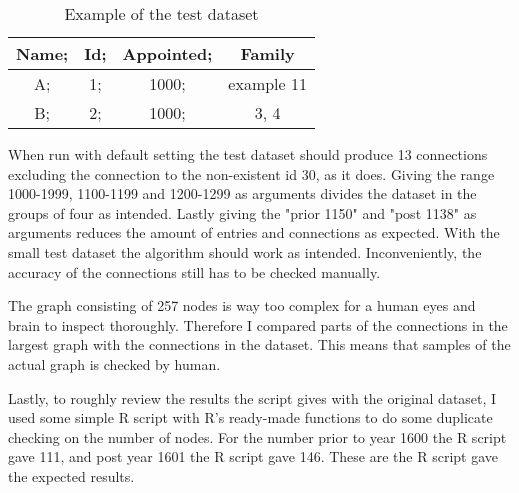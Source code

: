 \begin{table}
	\caption{Example of the test dataset}
	\centering
	\begin{tabular}{cccc}	
		\hline
		Name; &Id; &Appointed; &Family\\
		\hline
		A; &1; &1000; &example 11\\
		\hline
		B; &2; &1000; &3, 4\\
		\hline
	\end{tabular}
\end{table}

When run with default setting the test dataset should produce 13 connections excluding the connection to the non-existent id 30, as it does. Giving the range 1000-1999, 1100-1199 and 1200-1299 as arguments divides the dataset in the groups of four as intended. Lastly giving the "prior 1150" and "post 1138" as arguments reduces the amount of entries and connections as expected. With the small test dataset the algorithm should work as intended. Inconveniently, the accuracy of the connections still has to be checked manually. 

The graph consisting of 257 nodes is way too complex for a human eyes and brain to inspect thoroughly. Therefore I compared parts of the connections in the largest graph with the connections in the dataset. This means that samples of the actual graph is checked by human. 

Lastly, to roughly review the results the script gives with the original dataset, I used some simple R script with R's ready-made functions to do some duplicate checking on the number of nodes. For the number prior to year 1600 the R script gave 111, and post year 1601 the R script gave 146. These are the R script gave the expected results.
